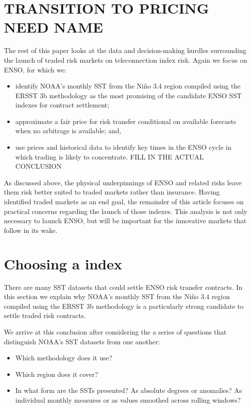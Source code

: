 \documentclass[authoryear]{article}
\begin{document}
\section{TRANSITION TO PRICING NEED NAME}
The rest of this paper looks at the data and decision-making hurdles surrounding the launch of traded risk markets on teleconnection index risk. Again we focus on ENSO, for which we:
\begin{itemize}
\item identify NOAA's monthly SST from the Ni\~no 3.4 region compiled using the ERSST 3b methodology as the most promising of the candidate ENSO SST indexes for contract settlement; 
\item approximate a fair price for risk transfer conditional on available forecasts when no arbitrage is available; and,
\item use prices and historical data to identify key times in the ENSO cycle in which trading is likely to concentrate. FILL IN THE ACTUAL CONCLUSION
\end{itemize}
As discussed above, the physical underpinnings of ENSO and related risks leave them risk better suited to traded markets rather than insurance. Having identified traded markets as an end goal, the remainder of this article focuses on practical concerns regarding the launch of those indexes. This analysis is not only necessary to launch ENSO, but will be important for the innovative markets that follow in its wake.

\section{Choosing a index}
There are many SST datasets that could settle ENSO risk transfer contracts. In this section we explain why NOAA's monthly SST from the Ni\~no 3.4 region compiled using the ERSST 3b methodology is a particularly strong candidate to settle traded risk contracts. 

We arrive at this conclusion after considering the a series of questions that distinguish NOAA's SST datasets from one another:
\begin{itemize}
\item Which methodology does it use?
\item Which region does it cover?
\item In what form are the SSTs presented? 
    \subitem As absolute degrees or anomalies? 
    \subitem As individual monthly measures or as values smoothed across rolling windows?
\end{itemize}
\end{document}
